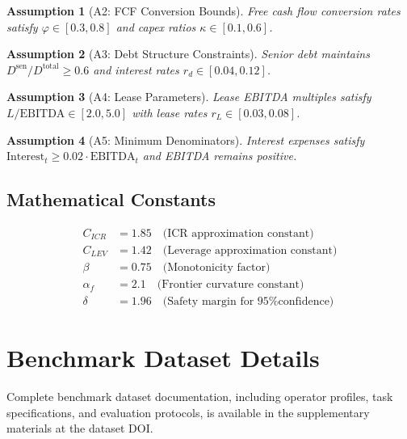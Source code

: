 \documentclass[11pt,a4paper]{article}
\newtheorem{assumption}{Assumption}
\newcommand{\phiFCF}{\varphi}       %
\begin{document}
\begin{assumption}[A2: FCF Conversion Bounds]
Free cash flow conversion rates satisfy $\phiFCF \in [0.3, 0.8]$ and capex ratios $\kappa \in [0.1, 0.6]$.
\end{assumption}

\begin{assumption}[A3: Debt Structure Constraints]
Senior debt maintains $D^{\text{sen}}/D^{\text{total}} \geq 0.6$ and interest rates $r_d \in [0.04, 0.12]$.
\end{assumption}

\begin{assumption}[A4: Lease Parameters]
Lease EBITDA multiples satisfy $L/\text{EBITDA} \in [2.0, 5.0]$ with lease rates $r_L \in [0.03, 0.08]$.
\end{assumption}

\begin{assumption}[A5: Minimum Denominators]
Interest expenses satisfy $\text{Interest}_t \geq 0.02 \cdot \text{EBITDA}_t$ and EBITDA remains positive.
\end{assumption}

\subsection{Mathematical Constants}

\begin{align}
C_{ICR} &= 1.85 \quad \text{(ICR approximation constant)} \\
C_{LEV} &= 1.42 \quad \text{(Leverage approximation constant)} \\
\beta &= 0.75 \quad \text{(Monotonicity factor)} \\
\alpha_f &= 2.1 \quad \text{(Frontier curvature constant)} \\
\delta &= 1.96 \quad \text{(Safety margin for 95\% confidence)}
\end{align}

\section{Benchmark Dataset Details}
\label{app:benchmark}

Complete benchmark dataset documentation, including operator profiles, task specifications, and evaluation protocols, is available in the supplementary materials at the dataset DOI.
\end{document}
